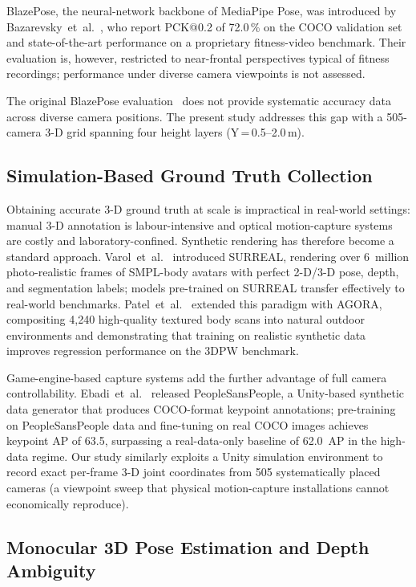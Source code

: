 \documentclass[english,fleqn]{ieej-e}
\begin{document}
BlazePose, the neural-network backbone of MediaPipe Pose, was introduced by
Bazarevsky~et~al.~\cite{blazepose}, who report PCK@0.2 of 72.0\,\% on the
COCO validation set and state-of-the-art performance on a proprietary
fitness-video benchmark. Their evaluation is, however, restricted to
near-frontal perspectives typical of fitness recordings; performance under
diverse camera viewpoints is not assessed.

The original BlazePose evaluation~\cite{blazepose} does not provide
systematic accuracy data across diverse camera positions.
The present study addresses this gap with a
505-camera 3-D grid spanning four height layers (Y\,=\,0.5--2.0\,m).

\subsection{Simulation-Based Ground Truth Collection}

Obtaining accurate 3-D ground truth at scale is impractical in real-world
settings: manual 3-D annotation is labour-intensive and optical
motion-capture systems are costly and laboratory-confined. Synthetic
rendering has therefore become a standard approach. Varol~et~al.~\cite{surreal}
introduced SURREAL, rendering over 6~million photo-realistic frames of
SMPL-body avatars with perfect 2-D/3-D pose, depth, and segmentation labels;
models pre-trained on SURREAL transfer effectively to real-world benchmarks.
Patel~et~al.~\cite{agora} extended this
paradigm with AGORA, compositing 4,240 high-quality textured body scans into
natural outdoor environments and demonstrating that training on realistic
synthetic data improves regression performance on the 3DPW benchmark.

Game-engine-based capture systems add the further advantage of full camera
controllability. Ebadi~et~al.~\cite{peoplesanspeople} released
PeopleSansPeople, a Unity-based synthetic data generator that produces
COCO-format keypoint annotations; pre-training on PeopleSansPeople data and
fine-tuning on real COCO images achieves keypoint AP of 63.5, surpassing a
real-data-only baseline of 62.0~AP in the high-data regime. Our study
similarly exploits a Unity simulation environment to record exact per-frame
3-D joint coordinates from 505 systematically placed cameras (a viewpoint
sweep that physical motion-capture installations cannot economically
reproduce).

\subsection{Monocular 3D Pose Estimation and Depth Ambiguity}
\end{document}
